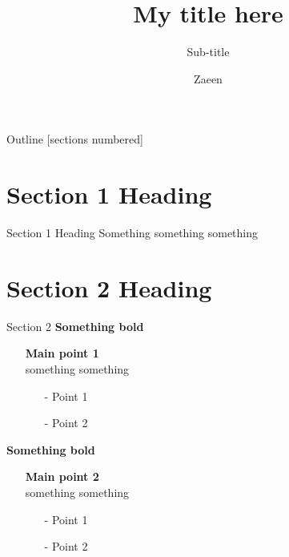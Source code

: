 \documentclass[9pt]{beamer}
\title{\alert{\textbf{My title here}}}
\subtitle{Sub-title}
\date{}
\author{Zaeen}
\institute{Azim Premji University}
\begin{document}
	\maketitle

	\begin{frame}{Outline}
		\small
		[sections numbered]
		\tableofcontents[hideallsubsections]
	\end{frame}

	\section[Section 1]{Section 1 Heading}



	\begin{frame}[Section 1]{Section 1 Heading}
		Something something something
	\end{frame}

	\section[Section 2]{Section 2 Heading}

	\begin{frame}[Section 2]{Section 2}
		\small
		\alert{\textbf{Something bold}}
		\begin{itemize}
			\item[] \textbf{Main point 1} \\
			something something
			\begin{itemize}
				\item[-] Point 1
				\item[-] Point 2
			\end{itemize}
		\end{itemize}
		\alert{\textbf{Something bold}}
		\begin{itemize}
			\item[] \textbf{Main point 2} \\
			something something
			\begin{itemize}
				\item[-] Point 1
				\item[-] Point 2
			\end{itemize}
		\end{itemize}
	\end{frame}
\end{document}
